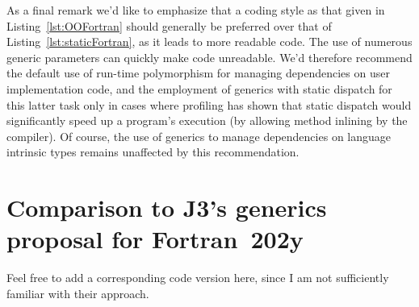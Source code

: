 \documentclass[11pt,oneside]{report}
\begin{document}
As a final remark we'd like to emphasize that a coding style as that
given in Listing~\ref{lst:OOFortran} should generally be preferred
over that of Listing~\ref{lst:staticFortran}, as it leads to more
readable code. The use of numerous generic parameters can quickly make
code unreadable. We'd therefore recommend the default use of run-time
polymorphism for managing dependencies on user implementation code,
and the employment of generics with static dispatch for this latter
task only in cases where profiling has shown that static dispatch
would significantly speed up a program's execution (by allowing method
inlining by the compiler). Of course, the use of generics to manage
dependencies on language intrinsic types remains unaffected by this
recommendation.

\chapter{Comparison to J3's generics proposal for Fortran~202y}

{\sf Feel free to add a corresponding code version here,
since I am not sufficiently familiar with their approach.}



\end{document}
